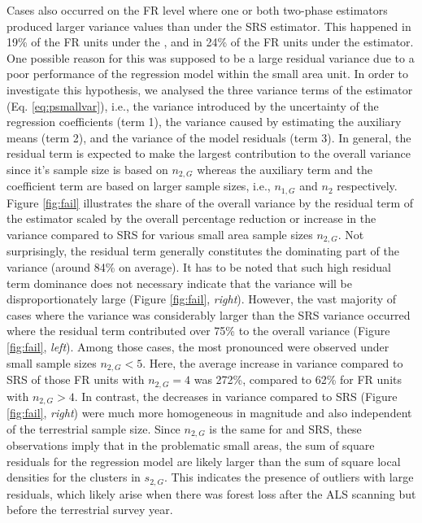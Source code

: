 Cases also occurred on the FR level where one or both two-phase estimators produced larger variance values than under the SRS estimator. This happened in 19\% of the FR units under the \extpsynth{}, and in 24\% of the FR units under the \psmall{} estimator. One possible reason for this was supposed to be a large residual variance due to a poor performance of the regression model within the small area unit. In order to investigate this hypothesis, we analysed the three variance terms of the \psmall{} estimator (Eq. \ref{eq:psmallvar}), i.e., the variance introduced by the uncertainty of the regression coefficients (term 1), the variance caused by estimating the auxiliary means (term 2), and the variance of the model residuals (term 3). In general, the residual term is expected to make the largest contribution to the overall variance since it's sample size is based on $n_{2,G}$ whereas the auxiliary term and the coefficient term are based on larger sample sizes, i.e., $n_{1,G}$ and $n_2$ respectively. Figure \ref{fig:fail} illustrates the share of the overall variance by the residual term of the \psmall{} estimator scaled by the overall percentage reduction or increase in the variance compared to SRS for various small area sample sizes $n_{2,G}$. Not surprisingly, the residual term generally constitutes the dominating part of the \psmall{} variance (around 84\% on average). It has to be noted that such high residual term dominance does not necessary indicate that the \psmall{} variance will be disproportionately large (Figure \ref{fig:fail}, \textit{right}). However, the vast majority of cases where the \psmall{} variance was considerably larger than the SRS variance occurred where the residual term contributed over 75\% to the overall \psmall{} variance (Figure \ref{fig:fail}, \textit{left}). Among those cases, the most pronounced were observed under small sample sizes $n_{2,G} < 5$. Here, the average increase in variance compared to SRS of those FR units with $n_{2,G}=4$ was 272\%, compared to 62\% for FR units with $n_{2,G} > 4$. In contrast, the decreases in variance compared to SRS (Figure \ref{fig:fail}, \textit{right}) were much more homogeneous in magnitude and also independent of the terrestrial sample size. Since $n_{2,G}$ is the same for \psmall{} and SRS, these observations imply that in the problematic small areas, the sum of square residuals for the regression model are likely larger than the sum of square local densities for the clusters in $s_{2,G}$. This indicates the presence of outliers with large residuals, which likely arise when there was forest loss after the ALS scanning but before the terrestrial survey year. %

